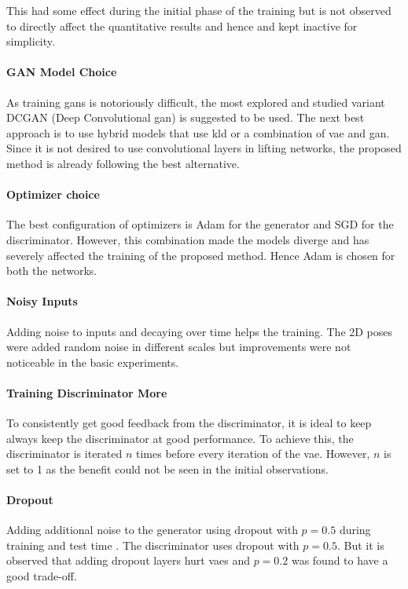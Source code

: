 This had some effect during the initial phase of the training but is not observed to directly affect the quantitative results and hence and kept inactive for simplicity.

\paragraph{GAN Model Choice} 
As training \acp{gan} is notoriously difficult, the most explored and studied variant DCGAN (Deep Convolutional \ac{gan}) is suggested to be used. The next best approach is to use hybrid models that use \ac{kld} or a combination of \ac{vae} and \ac{gan}. Since it is not desired to use convolutional layers in lifting networks, the proposed method is already following the best alternative.


\paragraph{Optimizer choice}
The best configuration of optimizers is Adam for the generator and SGD for the discriminator. However, this combination made the models diverge and has severely affected the training of the proposed method. Hence Adam is chosen for both the networks.

\paragraph{Noisy Inputs}
Adding noise to inputs and decaying over time helps the training. The 2D poses were added random noise in different scales but improvements were not noticeable in the basic experiments. 

\paragraph{Training Discriminator More}
To consistently get good feedback from the discriminator, it is ideal to keep always keep the discriminator at good performance. To achieve this, the discriminator is iterated $n$ times before every iteration of the \ac{vae}. However, $n$ is set to 1 as the benefit could not be seen in the initial observations.

\paragraph{Dropout}
Adding additional noise to the generator using dropout with $p=0.5$ during training and test time \cite{gan_dropout}. The discriminator uses dropout with $p=0.5$. But it is observed that adding dropout layers hurt \acp{vae} and $p=0.2$ was found to have a good trade-off. 


